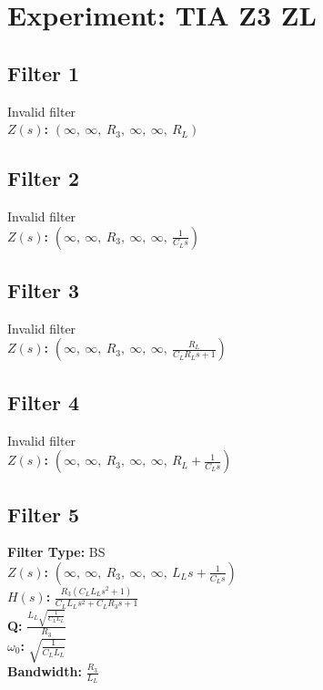 \documentclass{article}
\begin{document}
        \section*{Experiment: TIA Z3 ZL}
\subsection*{Filter 1}
Invalid filter \\ 
\textbf{$Z(s)$:} $\left( \infty, \  \infty, \  R_{3}, \  \infty, \  \infty, \  R_{L}\right)$ \\ 
\subsection*{Filter 2}
Invalid filter \\ 
\textbf{$Z(s)$:} $\left( \infty, \  \infty, \  R_{3}, \  \infty, \  \infty, \  \frac{1}{C_{L} s}\right)$ \\ 
\subsection*{Filter 3}
Invalid filter \\ 
\textbf{$Z(s)$:} $\left( \infty, \  \infty, \  R_{3}, \  \infty, \  \infty, \  \frac{R_{L}}{C_{L} R_{L} s + 1}\right)$ \\ 
\subsection*{Filter 4}
Invalid filter \\ 
\textbf{$Z(s)$:} $\left( \infty, \  \infty, \  R_{3}, \  \infty, \  \infty, \  R_{L} + \frac{1}{C_{L} s}\right)$ \\ 
\subsection*{Filter 5}
\textbf{Filter Type:} BS \\ 
\textbf{$Z(s)$:} $\left( \infty, \  \infty, \  R_{3}, \  \infty, \  \infty, \  L_{L} s + \frac{1}{C_{L} s}\right)$ \\ 
\textbf{$H(s)$:} $\frac{R_{3} \left(C_{L} L_{L} s^{2} + 1\right)}{C_{L} L_{L} s^{2} + C_{L} R_{3} s + 1}$ \\ 
\textbf{Q:} $\frac{L_{L} \sqrt{\frac{1}{C_{L} L_{L}}}}{R_{3}}$ \\ 
\textbf{$\omega_0$:} $\sqrt{\frac{1}{C_{L} L_{L}}}$ \\ 
\textbf{Bandwidth:} $\frac{R_{3}}{L_{L}}$ \\ 
\end{document}
